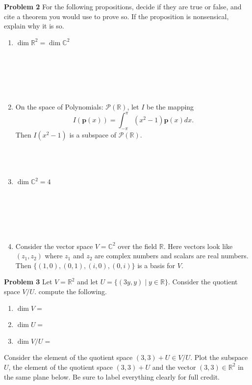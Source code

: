 \documentclass[12pt]{article}
\newcommand{\problem}[1]{\hspace{-4 ex} \large \textbf{Problem #1} }
\newcommand{\RR}{\mathbb{R}}
\newcommand{\CC}{\mathbb{C}}
\newcommand{\PP}{\mathcal{P}}
\renewcommand{\vec}[1]{\boldsymbol{\mathbf{#1}}}
\begin{document}
\pagebreak
\problem{2} For the following propositions, decide if they are true or false, and cite a theorem you would use to prove so. If the proposition is nonsensical, explain why it is so.
\begin{enumerate}
	\item $\dim \RR^2 = \dim \CC^2$ \\ \\ \\ \\ \\ \\
	\item On the space of Polynomials: $\PP(\RR)$, let $I$ be the mapping $$I(\vec{p}(x)) = \int_{-\pi}^{\pi} (x^2-1)\vec{p}(x) dx\text{.}$$ Then $I(x^2-1)$ is a subspace of $\PP(\RR)$. \\ \\ \\ \\
	\item $ \dim \CC^2 = 4$ \\ \\ \\ \\ \\ \\
	\item Consider the vector space $V = \CC^2$ over the field $\RR$. Here vectors look like $(z_1, z_2)$ where $z_1$ and $z_2$ are complex numbers and scalars are real numbers. Then %
	$\{(1,0), (0,1), (i,0), (0,i) \}$ is a basis for $V$.
\end{enumerate}

\pagebreak
\problem{3} Let $V = \RR^2$ and let $U = \{(3y, y) \mid y \in \RR\}$. Consider the quotient space $V/U$. compute the following.
\begin{enumerate}
	\item $\dim V = $ \\
	\item $\dim U = $ \\
	\item $\dim V/U = $\\
\end{enumerate}
\bigbreak
Consider the element of the quotient space $(3,3) + U \in V/U$. Plot the subspace $U$, the element of the quotient space $(3,3) + U$ and the vector $(3,3) \in \RR^2$ in the same plane below. Be sure to label everything clearly for full credit.
\end{document}
